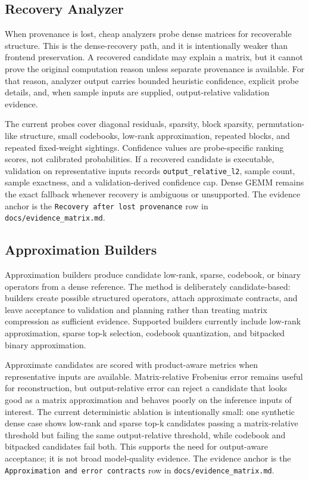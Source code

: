 \documentclass[11pt]{article}
\begin{document}
\subsection{Recovery Analyzer}

When provenance is lost, cheap analyzers probe dense matrices for recoverable
structure. This is the dense-recovery path, and it is intentionally weaker
than frontend preservation. A recovered candidate may explain a matrix, but it
cannot prove the original computation reason unless separate provenance is
available. For that reason, analyzer output carries bounded heuristic
confidence, explicit probe details, and, when sample inputs are supplied,
output-relative validation evidence.

The current probes cover diagonal residuals, sparsity, block sparsity,
permutation-like structure, small codebooks, low-rank approximation, repeated
blocks, and repeated fixed-weight sightings. Confidence values are
probe-specific ranking scores, not calibrated probabilities. If a recovered
candidate is executable, validation on representative inputs records
\texttt{output\_relative\_l2}, sample count, sample exactness, and a
validation-derived confidence cap. Dense GEMM remains the exact fallback
whenever recovery is ambiguous or unsupported. The evidence anchor is the
\texttt{Recovery after lost provenance} row in
\texttt{docs/evidence\_matrix.md}.

\subsection{Approximation Builders}

Approximation builders produce candidate low-rank, sparse, codebook, or binary
operators from a dense reference. The method is deliberately candidate-based:
builders create possible structured operators, attach approximate contracts,
and leave acceptance to validation and planning rather than treating matrix
compression as sufficient evidence. Supported builders currently include
low-rank approximation, sparse top-k selection, codebook quantization, and
bitpacked binary approximation.

Approximate candidates are scored with product-aware metrics when
representative inputs are available. Matrix-relative Frobenius error remains
useful for reconstruction, but output-relative error can reject a candidate
that looks good as a matrix approximation and behaves poorly on the inference
inputs of interest. The current deterministic ablation is intentionally small:
one synthetic dense case shows low-rank and sparse top-k candidates passing a
matrix-relative threshold but failing the same output-relative threshold, while
codebook and bitpacked candidates fail both. This supports the need for
output-aware acceptance; it is not broad model-quality evidence. The evidence
anchor is the \texttt{Approximation and error contracts} row in
\texttt{docs/evidence\_matrix.md}.
\end{document}
